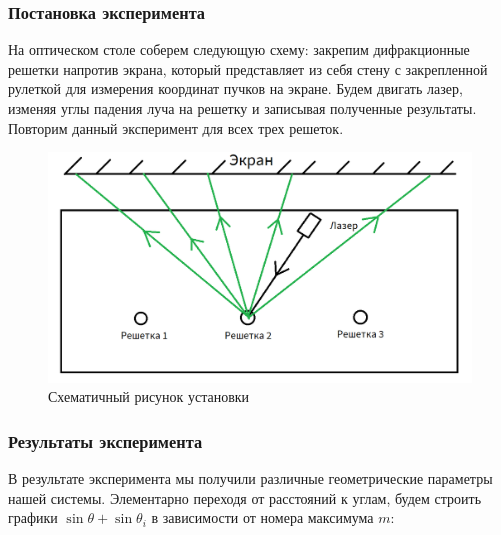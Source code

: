 \documentclass[a4paper,14pt]{extarticle}
\begin{document}
			\subsubsection{Постановка эксперимента}
			На оптическом столе соберем следующую схему: закрепим дифракционные решетки напротив экрана, который представляет из себя стену с закрепленной рулеткой для измерения координат пучков на экране. Будем двигать лазер, изменяя углы падения луча на решетку и записывая полученные результаты. Повторим данный эксперимент для всех трех решеток.
			
			\begin{figure}[h!]
				\centering
				\includegraphics[width=1\linewidth]{Diff3.png}
				\caption{Схематичный рисунок установки}
				\label{fig0}
			\end{figure}
		
			\newpage
			
			\subsubsection{Результаты эксперимента}
				В результате эксперимента мы получили различные геометрические параметры нашей системы. Элементарно переходя от расстояний к углам, будем строить графики $\sin{\theta} + \sin{\theta_i}$ в зависимости от номера максимума $m$:
				
				\newpage
				
\end{document}
